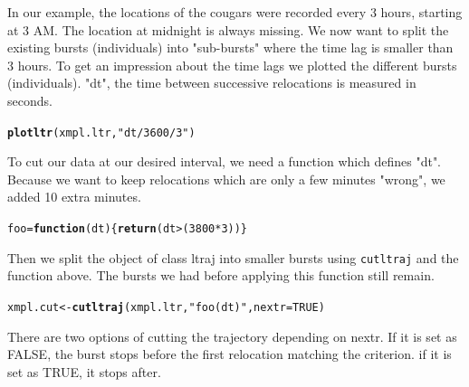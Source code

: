 \documentclass[11pt, a4paper]{article}\usepackage[]{graphicx}\usepackage[]{color}
\makeatletter
\newcommand{\hlnum}[1]{\textcolor[rgb]{0.686,0.059,0.569}{#1}}%
\newcommand{\hlstr}[1]{\textcolor[rgb]{0.192,0.494,0.8}{#1}}%
\newcommand{\hlopt}[1]{\textcolor[rgb]{0,0,0}{#1}}%
\newcommand{\hlstd}[1]{\textcolor[rgb]{0.345,0.345,0.345}{#1}}%
\newcommand{\hlkwa}[1]{\textcolor[rgb]{0.161,0.373,0.58}{\textbf{#1}}}%
\newcommand{\hlkwb}[1]{\textcolor[rgb]{0.69,0.353,0.396}{#1}}%
\newcommand{\hlkwc}[1]{\textcolor[rgb]{0.333,0.667,0.333}{#1}}%
\newcommand{\hlkwd}[1]{\textcolor[rgb]{0.737,0.353,0.396}{\textbf{#1}}}%
\newenvironment{kframe}{%
 \def\at@end@of@kframe{}%
 \ifinner\ifhmode%
  \def\at@end@of@kframe{\end{minipage}}%
  \begin{minipage}{\columnwidth}%
 \fi\fi%
 \def\FrameCommand##1{\hskip\@totalleftmargin \hskip-\fboxsep
 \colorbox{shadecolor}{##1}\hskip-\fboxsep
     \hskip-\linewidth \hskip-\@totalleftmargin \hskip\columnwidth}%
 \MakeFramed {\advance\hsize-\width
   \@totalleftmargin\z@ \linewidth\hsize
   \@setminipage}}%
 {\par\unskip\endMakeFramed%
 \at@end@of@kframe}
\newenvironment{knitrout}{}{} %
\makeatother
\begin{document}
In our example, the locations of the cougars were recorded every 3 hours, starting at 3 AM. The location at midnight is always missing. We now want to split the existing bursts (individuals) into "sub-bursts" where the time lag is smaller than 3 hours. To get an impression about the time lags we plotted the different bursts (individuals). "dt", the time between successive relocations is measured in seconds.

\begin{knitrout}
\color{fgcolor}\begin{kframe}
\begin{alltt}
\hlkwd{plotltr}\hlstd{(xmpl.ltr,} \hlstr{"dt/3600/3"}\hlstd{)}
\end{alltt}
\end{kframe}
\end{knitrout}

To cut our data at our desired interval, we need a function which defines "dt". Because we want to keep relocations which are only a few minutes "wrong", we added 10 extra minutes.

\begin{knitrout}
\color{fgcolor}\begin{kframe}
\begin{alltt}
\hlstd{foo} \hlkwb{=} \hlkwa{function}\hlstd{(}\hlkwc{dt}\hlstd{) \{}\hlkwd{return}\hlstd{(dt}\hlopt{>} \hlstd{(}\hlnum{3800}\hlopt{*}\hlnum{3}\hlstd{))\}}
\end{alltt}
\end{kframe}
\end{knitrout}

Then we split the object of class ltraj into smaller bursts using \texttt{cutltraj} and the function above. The bursts we had before applying this function still remain.

\begin{knitrout}
\color{fgcolor}\begin{kframe}
\begin{alltt}
\hlstd{xmpl.cut} \hlkwb{<-} \hlkwd{cutltraj}\hlstd{(xmpl.ltr,} \hlstr{"foo(dt)"}\hlstd{,} \hlkwc{nextr} \hlstd{=} \hlnum{TRUE}\hlstd{)}
\end{alltt}
\end{kframe}
\end{knitrout}

There are two options of cutting the trajectory depending on nextr. If it is set as FALSE, the burst stops before the first relocation matching the criterion. if it is set as TRUE, it stops after. \cite{0.3.162014}
\end{document}
